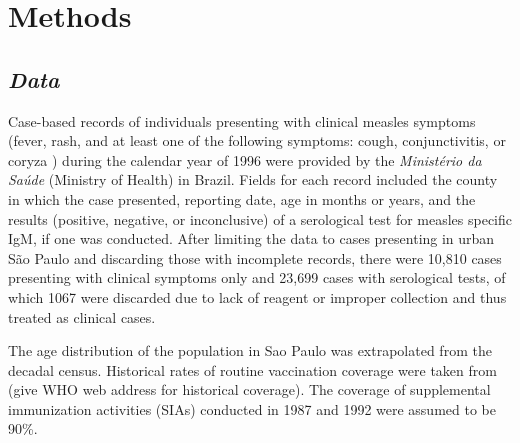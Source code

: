 \section{\texorpdfstring{\textbf{Methods}}{Methods}}\label{methods}

\subsection{\texorpdfstring{\emph{Data}}{Data}}\label{data}

Case-based records of individuals presenting with clinical measles symptoms (fever, rash, and at least one of the following symptoms: cough, conjunctivitis, or coryza \cite{Hutchins_2004}) during the calendar year of 1996 were provided by the \textit{Ministério da Saúde} (Ministry of Health) in Brazil. Fields for each record included the county in which the case presented, reporting date, age in months or years, and the results (positive, negative, or inconclusive) of a serological test for measles specific IgM, if one was conducted. After limiting the data to cases presenting in urban S\~{a}o Paulo and discarding those with incomplete records, there were 10,810 cases presenting with clinical symptoms only
and 23,699 cases with serological tests, of which 1067 were discarded due to lack of reagent or improper collection and thus treated as clinical cases.

The age distribution of the population in Sao Paulo was extrapolated from the decadal census. Historical rates of routine vaccination coverage were taken from (give WHO web address for historical coverage). The coverage of supplemental immunization activities (SIAs) conducted in 1987 and 1992 were assumed to be 90\%.